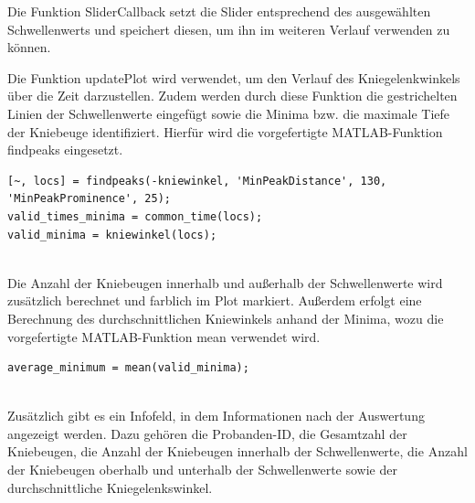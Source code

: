 \noindent Die Funktion SliderCallback setzt die Slider entsprechend des ausgewählten Schwellenwerts und speichert diesen, um ihn im weiteren Verlauf verwenden zu können.

\noindent Die Funktion updatePlot wird verwendet, um den Verlauf des Kniegelenkwinkels über die Zeit darzustellen. Zudem werden durch diese Funktion die gestrichelten Linien der Schwellenwerte eingefügt sowie die Minima bzw. die maximale Tiefe der Kniebeuge identifiziert. Hierfür wird die vorgefertigte MATLAB-Funktion findpeaks eingesetzt.

\begin{lstlisting}[style=Matlab-editor]
[~, locs] = findpeaks(-kniewinkel, 'MinPeakDistance', 130, 'MinPeakProminence', 25);
valid_times_minima = common_time(locs);
valid_minima = kniewinkel(locs);
\end{lstlisting}
\\
\noindent Die Anzahl der Kniebeugen innerhalb und außerhalb der Schwellenwerte wird zusätzlich berechnet und farblich im Plot markiert. Außerdem erfolgt eine Berechnung des durchschnittlichen Kniewinkels anhand der Minima, wozu die vorgefertigte MATLAB-Funktion mean verwendet wird.
\begin{lstlisting}[style=Matlab-editor]
average_minimum = mean(valid_minima);
\end{lstlisting}
\\
\noindent Zusätzlich gibt es ein Infofeld, in dem Informationen nach der Auswertung angezeigt werden. Dazu gehören die Probanden-ID, die Gesamtzahl der Kniebeugen, die Anzahl der Kniebeugen innerhalb der Schwellenwerte, die Anzahl der Kniebeugen oberhalb und unterhalb der Schwellenwerte sowie der durchschnittliche Kniegelenkswinkel.

